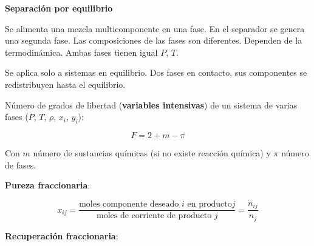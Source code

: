             \textbf{Separación por equilibrio}
            
            Se alimenta una mezcla multicomponente en una fase. En el separador se genera una segunda fase. Las composiciones de las fases son diferentes. Dependen de la termodinámica. Ambas fases tienen igual \(P\), \(T\).
        
            
            Se aplica solo a sistemas en equilibrio. Dos fases en contacto, sus componentes se redistribuyen hasta el equilibrio.
            
            Número de grados de libertad (\textbf{variables intensivas}) de un sistema de varias fases (\(P\), \(T\), \(\rho\), \(x_{i}\), \(y_{i}\)):
            
            \begin{equation}
            \label{eq:reglas_fases_gibbs}
                F = 2 + m - \pi
            \end{equation}
            
            Con \(m\) número de sustancias químicas (si no existe reacción química) y \(\pi\) número de fases.
            
            
            \textbf{Pureza fraccionaria}:
            
            \begin{quote}
                \textit{}
            \end{quote}
            
            \begin{equation}
            \label{eq:pureza_fraccionaria}
                x_{ij} = \frac{\text{moles componente deseado }i\text{ en producto} j}{\text{moles de corriente de producto }j} = \frac{\dot{n}_{ij}}{\dot{n}_{j}}
            \end{equation}
            \newpage
            
            \textbf{Recuperación fraccionaria}:

            \begin{quote}
                \textit{}
            \end{quote}
            
